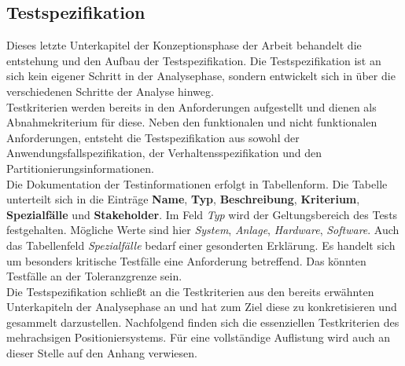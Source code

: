 \documentclass[../Bachelorarbeit.tex]{subfiles}
\begin{document}
\subsection{Testspezifikation}
Dieses letzte Unterkapitel der Konzeptionsphase der Arbeit behandelt die entstehung und den Aufbau der Testspezifikation. Die Testspezifikation ist an sich kein eigener Schritt in der Analysephase, sondern entwickelt sich in über die verschiedenen Schritte der Analyse hinweg.\\
Testkriterien werden bereits in den Anforderungen aufgestellt und dienen als Abnahmekriterium für diese. Neben den funktionalen und nicht funktionalen Anforderungen, entsteht die Testspezifikation aus sowohl der Anwendungsfallspezifikation, der Verhaltensspezifikation und den Partitionierungsinformationen.\\
Die Dokumentation der Testinformationen erfolgt in Tabellenform. Die Tabelle unterteilt sich in die Einträge \textbf{Name}, \textbf{Typ}, \textbf{Beschreibung}, \textbf{Kriterium}, \textbf{Spezialfälle} und \textbf{Stakeholder}. Im Feld \textit{Typ} wird der Geltungsbereich des Tests festgehalten. Mögliche Werte sind hier \textit{System}, \textit{Anlage}, \textit{Hardware}, \textit{Software}. Auch das Tabellenfeld \textit{Spezialfälle} bedarf einer gesonderten Erklärung. Es handelt sich um besonders kritische Testfälle eine Anforderung betreffend. Das könnten \zB Testfälle an der Toleranzgrenze sein.\\
Die Testspezifikation schließt an die Testkriterien aus den bereits erwähnten Unterkapiteln der Analysephase an und hat zum Ziel diese zu konkretisieren und gesammelt darzustellen. Nachfolgend finden sich die essenziellen Testkriterien des mehrachsigen Positioniersystems. Für eine vollständige Auflistung wird auch an dieser Stelle auf den Anhang verwiesen.
\end{document}

